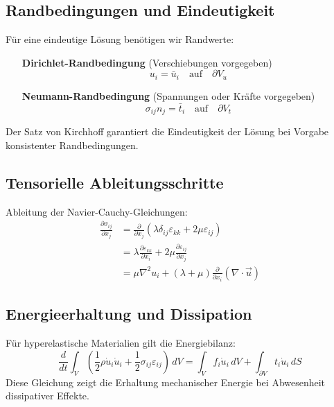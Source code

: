 \subsection{Randbedingungen und Eindeutigkeit}
Für eine eindeutige Lösung benötigen wir Randwerte:
\begin{enumerate}
	\item[\textbf{Dirichlet-Randbedingung}] (Verschiebungen vorgegeben)
	\begin{equation}
		u_i = 
		\bar{u}_i \quad \text{auf} \quad \partial V_u
	\end{equation}
	\item[\textbf{Neumann-Randbedingung}] (Spannungen oder Kräfte vorgegeben)
	\begin{equation}
		\sigma_{ij} n_j = 
		\bar{t}_i \quad \text{auf} \quad \partial V_t
	\end{equation}		
\end{enumerate}
Der Satz von Kirchhoff garantiert die Eindeutigkeit der Lösung bei Vorgabe konsistenter Randbedingungen.

\subsection{Tensorielle Ableitungsschritte}
Ableitung der Navier-Cauchy-Gleichungen:
\begin{align}
	\frac{\partial \sigma_{ij}}{\partial x_j}& = 
	\frac{\partial}{\partial x_j} \left( \lambda \delta_{ij} \varepsilon_{kk} + 2\mu \varepsilon_{ij} \right)
	\\
	&= \lambda \frac{\partial \varepsilon_{kk}}{\partial x_i} + 2\mu \frac{\partial \varepsilon_{ij}}{\partial x_j}
	\\
	&= \mu \nabla^2 u_i + (\lambda + \mu) \frac{\partial}{\partial x_i} (\nabla \cdot \vec{u})
\end{align}

\subsection{Energieerhaltung und Dissipation}
Für hyperelastische Materialien gilt die Energiebilanz:
\begin{equation}
	\frac{d}{dt} \int_V \left( \frac{1}{2} \rho \dot{u}_i \dot{u}_i + \frac{1}{2} \sigma_{ij} \varepsilon_{ij} \right) \, dV = 
	\int_V f_i \dot{u}_i \, dV + \int_{\partial V} t_i \dot{u}_i \, dS
\end{equation}
Diese Gleichung zeigt die Erhaltung mechanischer Energie bei Abwesenheit dissipativer Effekte.

